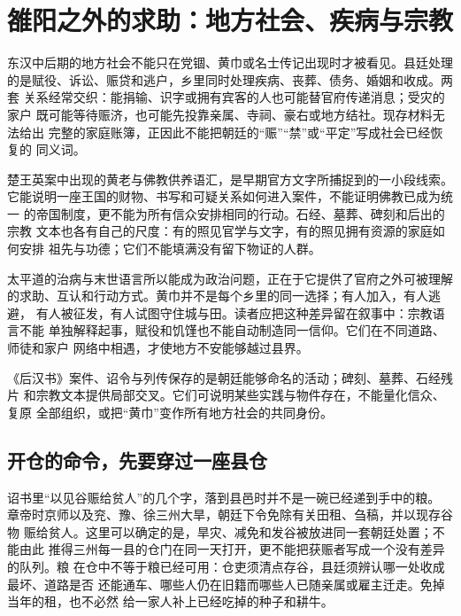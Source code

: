 \section{雒阳之外的求助：地方社会、疾病与宗教}
\label{sec:eastern-local-religion-relief}

东汉中后期的地方社会不能只在党锢、黄巾或名士传记出现时才被看见。县廷处理
的是赋役、诉讼、赈贷和逃户，乡里同时处理疾病、丧葬、债务、婚姻和收成。两套
关系经常交织：能捐输、识字或拥有宾客的人也可能替官府传递消息；受灾的家户
既可能等待赈济，也可能先投靠亲属、寺祠、豪右或地方结社。现存材料无法给出
完整的家庭账簿，正因此不能把朝廷的“赈”“禁”或“平定”写成社会已经恢复的
同义词。

楚王英案中出现的黄老与佛教供养语汇，是早期官方文字所捕捉到的一小段线索。
它能说明一座王国的财物、书写和可疑关系如何进入案件，不能证明佛教已成为统一
的帝国制度，更不能为所有信众安排相同的行动。石经、墓葬、碑刻和后出的宗教
文本也各有自己的尺度：有的照见官学与文字，有的照见拥有资源的家庭如何安排
祖先与功德；它们不能填满没有留下物证的人群。

太平道的治病与末世语言所以能成为政治问题，正在于它提供了官府之外可被理解
的求助、互认和行动方式。黄巾并不是每个乡里的同一选择；有人加入，有人逃避，
有人被征发，有人试图守住城与田。读者应把这种差异留在叙事中：宗教语言不能
单独解释起事，赋役和饥馑也不能自动制造同一信仰。它们在不同道路、师徒和家户
网络中相遇，才使地方不安能够越过县界。

\begin{sourcenote}[地方信仰不是一张宗教分布图]
《后汉书》案件、诏令与列传保存的是朝廷能够命名的活动；碑刻、墓葬、石经残片
和宗教文本提供局部交叉。它们可说明某些实践与物件存在，不能量化信众、复原
全部组织，或把“黄巾”变作所有地方社会的共同身份。
\end{sourcenote}

\subsection{开仓的命令，先要穿过一座县仓}

诏书里“以见谷赈给贫人”的几个字，落到县邑时并不是一碗已经递到手中的粮。
章帝时京师以及兖、豫、徐三州大旱，朝廷下令免除有关田租、刍稿，并以现存谷物
赈给贫人。这里可以确定的是，旱灾、减免和发谷被放进同一套朝廷处置；不能由此
推得三州每一县的仓门在同一天打开，更不能把获赈者写成一个没有差异的队列。粮
在仓中不等于粮已经可用：仓吏须清点存谷，县廷须辨认哪一处收成最坏、道路是否
还能通车、哪些人仍在旧籍而哪些人已随亲属或雇主迁走。免掉当年的租，也不必然
给一家人补上已经吃掉的种子和耕牛。

